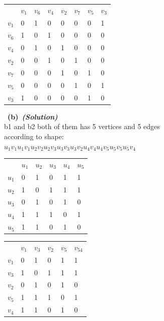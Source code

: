 \documentclass[a4 paper]{article}
\newcommand{\subproblem}[1]{~\newline\textbf{(#1)}}
\newcommand{\solutionx}{~\textbf{\textit{(Solution)}} }
\newcommand{\0}{\mathbf{0}}
\begin{document}
\begin{table}[]
\begin{tabular}{llllllll}
  & $v_1$ & $v_6$ & $v_4$ & $v_2$ & $v_7$ & $v_5$ & $v_3$ \\
$v_1$ & 0 & 1 & 0 & 0 & 0 & 0 & 1 \\
$v_6$ & 1 & 0 & 1 & 0 & 0 & 0 & 0 \\
$v_4$ & 0 & 1 & 0 & 1 & 0 & 0 & 0 \\
$v_2$ & 0 & 0 & 1 & 0 & 1 & 0 & 0 \\
$v_7$ & 0 & 0 & 0 & 1 & 0 & 1 & 0 \\
$v_5$ & 0 & 0 & 0 & 0 & 1 & 0 & 1 \\
$v_3$ & 1 & 0 & 0 & 0 & 0 & 1 & 0
\end{tabular}
\end{table}
\newline
\subproblem{b}\solutionx\\
\newline
b1 and b2 both of them has 5 vertices and 5 edges\\
\newline 
according to shape:\\
$u_1$\qquad$v_1$\qquad$u_1$\Rightarrow$v_1$\newline$u_2$\qquad$v_2$\qquad$u_2$\Rightarrow$v_3$\newline$u_3$\qquad$v_3$\qquad$u_3$\Rightarrow$v_2$\newline$u_4$\qquad$v_4$\qquad$u_4$\Rightarrow$v_5$\newline$u_5$\qquad$v_5$\qquad$u_5$\Rightarrow$v_4$\\
\newline
\begin{table}[]
\begin{tabular}{llllll}
  & $u_1$ & $u_2$ & $u_3$ & $u_4$ & $u_5$\\
$u_1$ & 0 & 1 & 0 & 1 & 1  \\
$u_2$ & 1 & 0 & 1 & 1 & 1  \\
$u_3$ & 0 & 1 & 0 & 1 & 0  \\
$u_4$ & 1 & 1 & 1 & 0 & 1  \\
$u_5$ & 1 & 1 & 0 & 1 & 0  
\end{tabular}
\end{table}
\begin{table}[]
\begin{tabular}{llllll}
  & $v_1$ & $v_3$ & $v_2$ & $v_5$ & $v_54$\\
$v_1$ & 0 & 1 & 0 & 1 & 1  \\
$v_3$ & 1 & 0 & 1 & 1 & 1  \\
$v_2$ & 0 & 1 & 0 & 1 & 0  \\
$v_5$ & 1 & 1 & 1 & 0 & 1  \\
$v_4$ & 1 & 1 & 0 & 1 & 0  
\end{tabular}
\end{table}
\end{document}
